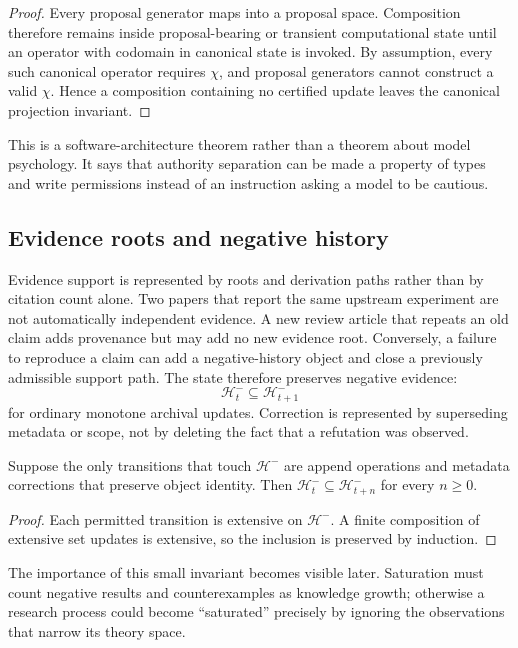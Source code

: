 \begin{proof}
Every proposal generator maps into a proposal space. Composition therefore remains inside proposal-bearing or transient computational state until an operator with codomain in canonical state is invoked. By assumption, every such canonical operator requires \(\chi\), and proposal generators cannot construct a valid \(\chi\). Hence a composition containing no certified update leaves the canonical projection invariant.
\end{proof}

This is a software-architecture theorem rather than a theorem about model psychology. It says that authority separation can be made a property of types and write permissions instead of an instruction asking a model to be cautious.

\subsection{Evidence roots and negative history}

Evidence support is represented by roots and derivation paths rather than by citation count alone. Two papers that report the same upstream experiment are not automatically independent evidence. A new review article that repeats an old claim adds provenance but may add no new evidence root. Conversely, a failure to reproduce a claim can add a negative-history object and close a previously admissible support path. The state therefore preserves negative evidence:
\[
\mathcal H_t^{-}\subseteq \mathcal H_{t+1}^{-}
\]
for ordinary monotone archival updates. Correction is represented by superseding metadata or scope, not by deleting the fact that a refutation was observed.

\begin{proposition}
Suppose the only transitions that touch \(\mathcal H^{-}\) are append operations and metadata corrections that preserve object identity. Then \(\mathcal H_t^{-}\subseteq\mathcal H_{t+n}^{-}\) for every \(n\ge 0\).
\end{proposition}

\begin{proof}
Each permitted transition is extensive on \(\mathcal H^{-}\). A finite composition of extensive set updates is extensive, so the inclusion is preserved by induction.
\end{proof}

The importance of this small invariant becomes visible later. Saturation must count negative results and counterexamples as knowledge growth; otherwise a research process could become ``saturated'' precisely by ignoring the observations that narrow its theory space.

